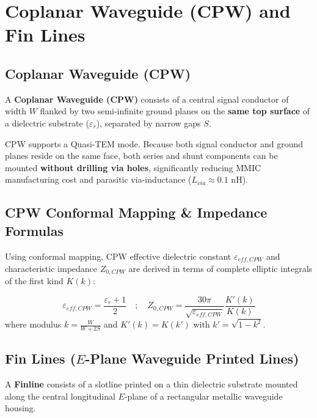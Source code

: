 \documentclass[12pt,a4paper]{article}
\begin{document}
\section{Coplanar Waveguide (CPW) and Fin Lines}

\subsection{Coplanar Waveguide (CPW)}
A \textbf{Coplanar Waveguide (CPW)} consists of a central signal conductor of width $W$ flanked by two semi-infinite ground planes on the \textbf{same top surface} of a dielectric substrate ($\varepsilon_r$), separated by narrow gaps $S$.

\begin{tcolorbox}[masonbox, title={Coplanar Waveguide (CPW) Advantages}]
  CPW supports a Quasi-TEM mode. Because both signal conductor and ground planes reside on the same face, both series and shunt components can be mounted \textbf{without drilling via holes}, significantly reducing MMIC manufacturing cost and parasitic via-inductance ($L_{via} \approx 0.1\text{ nH}$).
\end{tcolorbox}

\subsection{CPW Conformal Mapping \& Impedance Formulas}
Using conformal mapping, CPW effective dielectric constant $\varepsilon_{eff,CPW}$ and characteristic impedance $Z_{0,CPW}$ are derived in terms of complete elliptic integrals of the first kind $K(k)$:

\begin{tcolorbox}[formulabox, title={CPW Closed-Form Impedance Expressions}]
  \begin{equation}
    \varepsilon_{eff,CPW} = \frac{\varepsilon_r + 1}{2} \quad ; \quad Z_{0,CPW} = \frac{30\pi}{\sqrt{\varepsilon_{eff,CPW}}} \frac{K'(k)}{K(k)}
  \end{equation}
  where modulus $k = \frac{W}{W + 2S}$ and $K'(k) = K(k')$ with $k' = \sqrt{1 - k^2}$.
\end{tcolorbox}

\subsection{Fin Lines ($E$-Plane Waveguide Printed Lines)}
A \textbf{Finline} consists of a slotline printed on a thin dielectric substrate mounted along the central longitudinal $E$-plane of a rectangular metallic waveguide housing.
\end{document}
